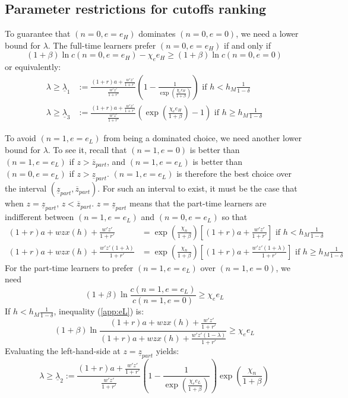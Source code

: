 \documentclass[12pt]{article}
\begin{document}
\subsection{Parameter restrictions for cutoffs ranking}
\label{app:cutoff_ranking}
To guarantee that $(n=0,e=e_H)$ dominates $(n=0,e=0)$, we need a lower bound for $\lambda$.
The full-time learners prefer $(n=0,e=e_H)$ if and only if
\begin{equation*}
    (1+\beta)\ln c(n=0,e=e_H) - \chi_e e_H \geq (1+\beta)\ln c(n=0,e=0)
\end{equation*}
or equivalently:
\begin{align}
    \lambda \geq \underline{\lambda}_1&:=\frac{(1+r)a+\frac{w'z'}{1+r'}}{\frac{w'z'}{1+r'}}\left(1-\frac{1}{\exp(\frac{\chi_e e_H}{1+\beta})}\right) \text{ if } h<h_M\frac{1}{1-\delta} \label{app:lambda1} \\
    \lambda \geq \underline{\lambda}_3&:=\frac{(1+r)a+\frac{w'z'}{1+r'}}{\frac{w'z'}{1+r'}}\left(\exp(\frac{\chi_e e_H}{1+\beta})-1\right) \text{ if } h \geq h_M\frac{1}{1-\delta} \label{app:lambda3} 
\end{align}
    

\bigskip
\noindent
To avoid $(n=1,e=e_L)$ from being a dominated choice, we need another lower bound for $\lambda$.
To see it, recall that $(n=1,e=0)$ is better than $(n=1,e=e_L)$ if $z>\overline{z}_{part}$, and $(n=1,e=e_L)$ is better than $(n=0,e=e_L)$ if $z>\underline{z}_{part}$. $(n=1,e=e_L)$ is therefore the best choice over the interval $(\underline{z}_{part},\overline{z}_{part})$. For such an interval to exist, it must be the case that when $z=\underline{z}_{part}$, $z<\overline{z}_{part}$. $z=\underline{z}_{part}$ means that the part-time learners are indifferent between $(n=1,e=e_L)$ and $(n=0,e=e_L)$ so that
\begin{align}
    (1+r)a+wzx(h)+\frac{w'z'}{1+r'}&=\exp(\frac{\chi_n}{1+\beta})\left[(1+r)a+\frac{w'z'}{1+r'}\right] \text{ if } h<h_M\frac{1}{1-\delta} \\
    (1+r)a+wzx(h)+\frac{w'z'(1+\lambda)}{1+r'}&=\exp(\frac{\chi_n}{1+\beta})\left[(1+r)a+\frac{w'z'(1+\lambda)}{1+r'}\right] \text{ if } h \geq h_M\frac{1}{1-\delta} 
\end{align}
For the part-time learners to prefer $(n=1,e=e_L)$ over $(n=1,e=0)$, we need
\begin{equation}\label{app:eL}
    (1+\beta)\ln\frac{c(n=1,e=e_L)}{c(n=1,e=0)} \geq \chi_e e_L
\end{equation}
If $h<h_M\frac{1}{1-\delta}$, inequality (\ref{app:eL}) is:
\begin{equation*}
    (1+\beta)\ln\frac{(1+r)a+wzx(h)+\frac{w'z'}{1+r'}}{(1+r)a+wzx(h)+\frac{w'z'(1-\lambda)}{1+r'}} \geq \chi_e e_L 
\end{equation*}
Evaluating the left-hand-side at $z=\underline{z}_{part}$ yields:
\begin{equation}
    \lambda \geq \underline{\lambda}_2:=\frac{(1+r)a+\frac{w'z'}{1+r'}}{\frac{w'z'}{1+r'}}\left(1-\frac{1}{\exp(\frac{\chi_e e_L}{1+\beta})}\right)\exp(\frac{\chi_n}{1+\beta}) \label{app:lambda2}
\end{equation}
\end{document}
